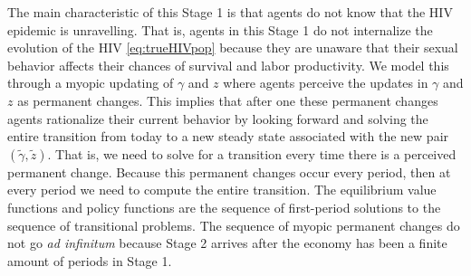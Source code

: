 The main characteristic of this Stage 1 is that agents do not know that the HIV epidemic is unravelling. That is, agents in this Stage 1 do not internalize the evolution of the HIV \eqref{eq:trueHIVpop} because they are unaware that their sexual behavior affects their chances of survival and labor productivity. We model this through a myopic updating of $\gamma$ and $z$ where agents perceive the updates in $\gamma$ and $z$ as permanent changes. This implies that after one these permanent changes agents rationalize their current behavior by looking forward and solving the entire transition from today to a new steady state associated with the new pair $(\widetilde{\gamma},\widetilde{z})$. That is, we need to solve for a transition every time there is a perceived permanent change. Because this permanent changes occur every period, then at every period we need to compute the entire transition. The equilibrium value functions and policy functions are the sequence of first-period solutions to the sequence of transitional problems. The sequence of myopic permanent changes do not go \textit{ad infinitum} because Stage 2 arrives after the economy has been a finite amount of periods in Stage 1.



